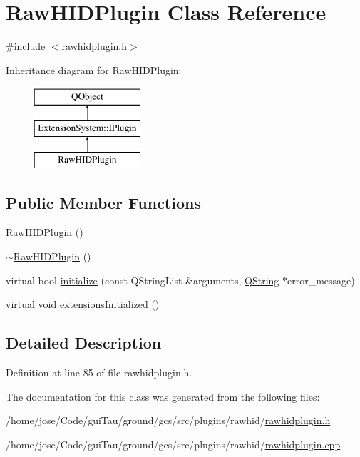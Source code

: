 \hypertarget{class_raw_h_i_d_plugin}{\section{Raw\-H\-I\-D\-Plugin Class Reference}
\label{class_raw_h_i_d_plugin}
}


{\ttfamily \#include $<$rawhidplugin.\-h$>$}

Inheritance diagram for Raw\-H\-I\-D\-Plugin\-:\begin{figure}[H]
\begin{center}
\leavevmode
\includegraphics[height=3.000000cm]{class_raw_h_i_d_plugin}
\end{center}
\end{figure}
\subsection*{Public Member Functions}
\begin{DoxyCompactItemize}
\item 
\hyperlink{group___raw_h_i_d_plugin_gab33af7d70867d692cd24d8f740449278}{Raw\-H\-I\-D\-Plugin} ()
\item 
\hyperlink{group___raw_h_i_d_plugin_ga0201928dc19d45a2e3771f6631af7fd5}{$\sim$\-Raw\-H\-I\-D\-Plugin} ()
\item 
virtual bool \hyperlink{group___raw_h_i_d_plugin_ga52bbfe9d4f2cd93a959bdd723438e522}{initialize} (const Q\-String\-List \&arguments, \hyperlink{group___u_a_v_objects_plugin_gab9d252f49c333c94a72f97ce3105a32d}{Q\-String} $\ast$error\-\_\-message)
\item 
virtual \hyperlink{group___u_a_v_objects_plugin_ga444cf2ff3f0ecbe028adce838d373f5c}{void} \hyperlink{group___raw_h_i_d_plugin_ga59b1e6d264de04d48bb83b823f91a5fe}{extensions\-Initialized} ()
\end{DoxyCompactItemize}


\subsection{Detailed Description}


Definition at line 85 of file rawhidplugin.\-h.



The documentation for this class was generated from the following files\-:\begin{DoxyCompactItemize}
\item 
/home/jose/\-Code/gui\-Tau/ground/gcs/src/plugins/rawhid/\hyperlink{rawhidplugin_8h}{rawhidplugin.\-h}\item 
/home/jose/\-Code/gui\-Tau/ground/gcs/src/plugins/rawhid/\hyperlink{rawhidplugin_8cpp}{rawhidplugin.\-cpp}\end{DoxyCompactItemize}
